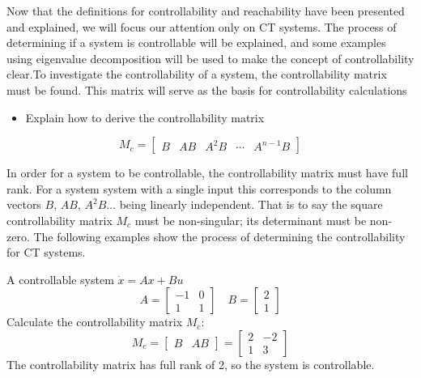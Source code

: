Now that the definitions for controllability and reachability have been presented and explained, we will focus our attention only on CT systems.
The process of determining if a system is controllable will be explained, and some examples using eigenvalue decomposition will be used to make the concept of controllability clear.To investigate the controllability of a system, the controllability matrix must be found.
This matrix will serve as the basis for controllability calculations
\begin{itemize}
  \item{Explain how to derive the controllability matrix}
\end{itemize}

\begin{equation*}
  M_{c}=
  \left[
    \begin{array}{ccccc}
      B & AB & A^{2}B & \cdots & A^{n-1}B
    \end{array}
  \right]
\end{equation*}

In order for a system to be controllable, the controllability matrix must have full rank.
For a system system with a single input this corresponds to the column vectors $B$, $AB$, $A^{2}B \dots$ being linearly independent.
That is to say the square controllability matrix $M_{c}$ must be non-singular; its determinant must be non-zero.
The following examples show the process of determining the controllability for CT systems.

\begin{example}
  A controllable system $\dot{x}=Ax+Bu$
  \begin{equation*}
    A=\left[
      \begin{array}{cc}
        -1 & 0 \\
        1 & 1
      \end{array}
    \right]
    \quad B=
    \left[
      \begin{array}{c}
        2 \\
        1
      \end{array}
    \right]
  \end{equation*}
  Calculate the controllability matrix $M_{c}$:
  \begin{equation*}
    M_{c}=
    \left[
      \begin{array}{cc}
        B & AB
      \end{array}
    \right]
    =
    \left[
      \begin{array}{cc}
        2 & -2 \\
        1 & 3
      \end{array}
    \right]
  \end{equation*}
  The controllability matrix has full rank of 2, so the system is controllable.
\end{example}

